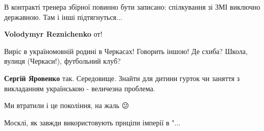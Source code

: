 \begin{itemize}
В контракті тренера збірної повинно бути записано: спілкування зі ЗМІ виключно
державною. Там і інші підтягнуться...

\begin{itemize}
 
\textbf{Volodymyr Reznichenko} от!
\end{itemize}

 
Виріс в україномовній родині в Черкасах! Говорить іншою! Де схиба? Школа,
вулиця (Черкаси!), футбольний клуб?

\begin{itemize}
 
\textbf{Сергій Яровенко} так. Середовище. Знайти для дитини гурток чи заняття з викладанням українською - величезна проблема.
\end{itemize}

 
Ми втратили і це покоління, на жаль 😕

 
Москлі, як завжди використовують прнціпи імперії в "...

 

\end{itemize}
